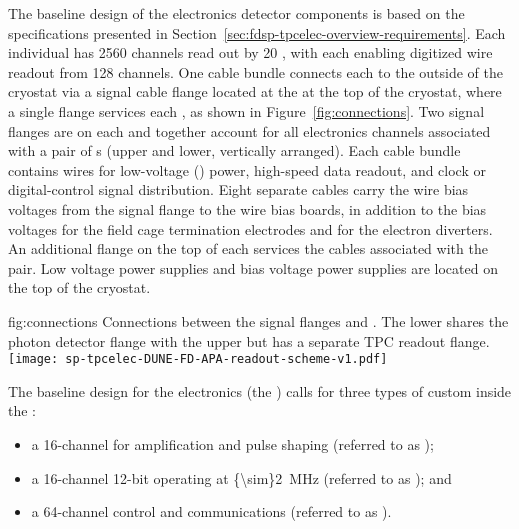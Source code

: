 The baseline design of the  electronics detector components is
based on the specifications presented in Section~\ref{sec:fdsp-tpcelec-overview-requirements}. 
Each individual  has \num{2560} channels read out by \num{20} 
, with each  enabling digitized wire readout 
from \num{128} channels. One cable bundle connects each  to
the outside of the cryostat via a  signal cable flange located 
at the  \fdth at the top of the cryostat, where a single flange 
services each , as shown in Figure~\ref{fig:connections}. 
Two  signal flanges are on each \fdth and together account for 
all electronics channels associated with a pair of s (upper 
and lower, vertically arranged). Each cable bundle contains wires for 
low-voltage () power, high-speed data readout, and clock or 
digital-control signal distribution. Eight separate cables carry the 
 wire bias voltages from the signal flange to the  
wire bias boards, in addition to the bias voltages for the field cage 
termination electrodes and for the electron diverters. An additional 
flange on the top of each \fdth services the  cables associated 
with the  pair. Low voltage power supplies and bias voltage
power supplies are located on the top of the cryostat. 

\begin{dunefigure}
{fig:connections}
{Connections between the signal flanges and . The lower 
 shares the photon detector flange with the 
upper  but has a separate TPC readout flange.}
\texttt{[image: sp-tpcelec-DUNE-FD-APA-readout-scheme-v1.pdf]}
\end{dunefigure}

The baseline design for the   electronics (the ) calls for three 
types of custom  inside  the :
\begin{itemize}
\item{a \num{16}-channel   for amplification 
and pulse shaping (referred to as );}
\item{a \num{16}-channel \num{12}-bit   
operating at \SI{{\sim}2}{MHz} (referred to as ); and}
\item{a \num{64}-channel control and communications  
(referred to as ).}
\end{itemize}

